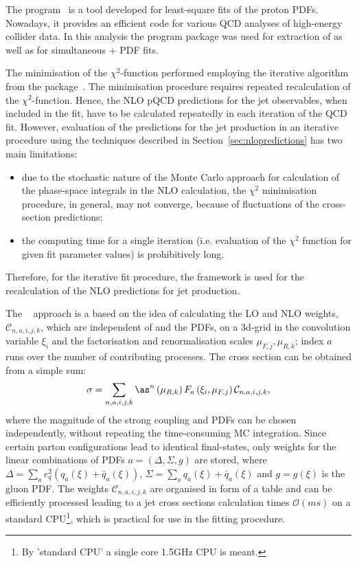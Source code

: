 The \herafitter program~\cite{Aaron:2009aa,Aaron:2009kv} is a tool developed for least-square fits of the proton PDFs. Nowadays, it provides an efficient code for various QCD analyses of high-energy collider data. In this analysis the \herafitter program package was used for extraction of \as as well as for simultaneous \as+ PDF fits.

The minimisation of the $\chi^2$-function performed employing the iterative \migrad algorithm from the \minuit package~\cite{James:1975dr}. The minimisation procedure requires repeated recalculation of the $\chi^2$-function. Hence, the NLO pQCD predictions for the jet observables, when included in the fit, have to be calculated repeatedly in each iteration of the QCD fit. However, evaluation of the predictions for the jet production in an iterative procedure using the techniques described in Section~\ref{sec:nlopredictions} has two main limitations: 
\begin{itemize}
 \item due to the stochastic nature of the Monte Carlo approach for calculation of the phase-space integrals in the NLO calculation, the $\chi^2$ minimisation procedure, in general, may not converge, because of fluctuations of the cross-section predictions;
 \item the computing time for a single iteration (i.e. evaluation of the $\chi^2$ function for given fit parameter values) is prohibitively long.
\end{itemize}
Therefore, for the iterative fit procedure, the \fastnlo framework is used for the recalculation of the NLO predictions for jet production. 

The \fastnlo~\cite{thesis:wobisch:2001,Kluge:2006,Wobisch:2011,Britzger:2012} approach is a based on the idea of calculating the LO and NLO weights, $\mathcal{C}_{n,a,i,j,k}$, which are independent of \as and the PDFs, on a 3d-grid in the convolution variable $\xi_i$ and the factorisation and renormalisation scales $\mu_{F,j}, \mu_{R,k}$; index $a$ runs over the number of contributing processes. The cross section can be obtained from a simple sum:
\begin{equation}
\sigma = \sum_{n,a,i,j,k}{ \as^n\left( \mu_{R,k} \right) F_a\left( \xi_i, \mu_{F,j}\right)\mathcal{C}_{n,a,i,j,k} },
\end{equation}
where the magnitude of the strong coupling and PDFs can be chosen independently, without repeating the time-consuming MC integration. Since certain parton configurations lead to identical final-states, only weights for the linear combinations of PDFs $a=\left( \Delta, \Sigma, g\right) $ are stored, where $\Delta=\sum_a{e_q^2\left(q_a\left(\xi\right)+\bar{q}_a\left(\xi\right)\right)}$, $\Sigma=\sum_a{q_a\left(\xi\right)+\bar{q}_a\left(\xi\right)}$ and $g=g\left(\xi\right)$ is the gluon PDF. The weights $\mathcal{C}_{n,a,i,j,k}$ are organised in form of a table and can be efficiently processed leading to a jet cross sections calculation times $\mathcal{O}\left( ms\right)$ on a standard CPU\footnote{By 'standard CPU' a single core 1.5GHz CPU is meant.}, which is practical for use in the fitting procedure.

